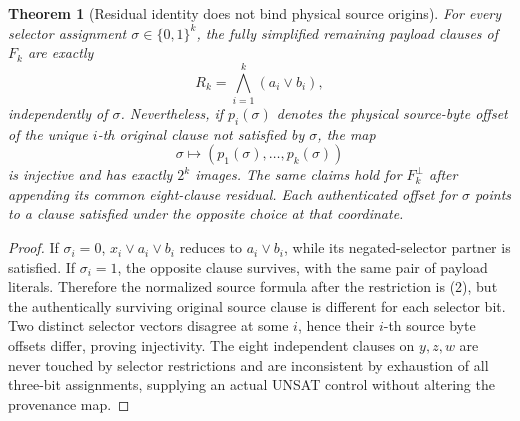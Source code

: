 \documentclass[11pt]{article}
\newtheorem{theorem}{Theorem}
\begin{document}
\begin{theorem}[Residual identity does not bind physical source origins]\label{th:provenance}
For every selector assignment \(\sigma\in\{0,1\}^k\), the fully simplified remaining payload clauses of \(F_k\) are exactly
\[R_k=\bigwedge_{i=1}^k(a_i\vee b_i),\tag{2}\]
independently of \(\sigma\). Nevertheless, if \(p_i(\sigma)\) denotes the \emph{physical source-byte offset} of the unique \(i\)-th original clause not satisfied by \(\sigma\), the map
\[\sigma\longmapsto(p_1(\sigma),\ldots,p_k(\sigma))\tag{3}\]
is injective and has exactly \(2^k\) images. The same claims hold for \(F_k^{\bot}\) after appending its common eight-clause residual. Each authenticated offset for \(\sigma\) points to a clause \emph{satisfied} under the opposite choice at that coordinate.
\end{theorem}
\begin{proof}
If \(\sigma_i=0\), \(x_i\vee a_i\vee b_i\) reduces to \(a_i\vee b_i\), while its negated-selector partner is satisfied. If \(\sigma_i=1\), the opposite clause survives, with the same pair of payload literals. Therefore the normalized source formula after the restriction is (2), but the authentically surviving original source clause is different for each selector bit. Two distinct selector vectors disagree at some \(i\), hence their \(i\)-th source byte offsets differ, proving injectivity. The eight independent clauses on \(y,z,w\) are never touched by selector restrictions and are inconsistent by exhaustion of all three-bit assignments, supplying an actual UNSAT control without altering the provenance map.
\end{proof}
\end{document}

